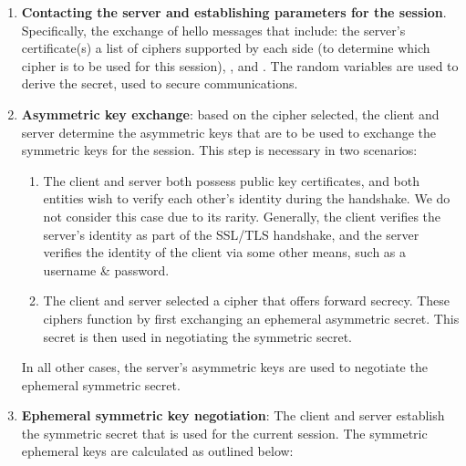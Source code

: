 \documentclass[../main.tex]{subfiles}
\begin{document}
\begin{enumerate}
  \item \textbf{Contacting the server and establishing parameters for
    the session}. Specifically, the exchange of hello messages that
    include: the server's certificate(s) a list of ciphers supported by
    each side (to determine which cipher is to be used for this session),
    \srandom, and \crandom. The random variables are used to derive the
    secret, used to secure communications.
  \item \textbf{Asymmetric key exchange}: based on the cipher
    selected, the client and server determine the asymmetric keys that are
    to be used to exchange the symmetric keys for the session. This step
    is necessary in two scenarios:
    \begin{enumerate}
      \item The client and server both possess public key
        certificates, and both entities wish to verify each other's identity
        during the handshake. We do not consider this case due to its
        rarity. Generally, the client verifies the server's identity as part
        of the SSL/TLS handshake, and the server verifies the identity of the
        client via some other means, such as a username \& password.
      \item The client and server selected a cipher that offers
        forward secrecy. These ciphers function by first exchanging an
        ephemeral asymmetric secret. This secret is then used in negotiating
        the symmetric secret.
    \end{enumerate} In all other cases, the server's asymmetric keys
    are used to negotiate the ephemeral symmetric secret.
  \item \textbf{Ephemeral symmetric key negotiation}: The client and
    server establish the symmetric secret that is used for the current
    session. The symmetric ephemeral keys are calculated as outlined
    below:


\end{enumerate}
\end{document}
